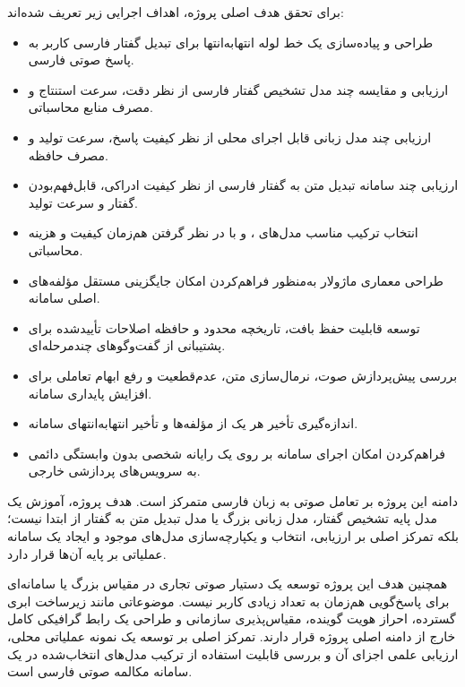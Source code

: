 برای تحقق هدف اصلی پروژه، اهداف اجرایی زیر تعریف شده‌اند:

\begin{itemize}

    \item طراحی و پیاده‌سازی یک خط لوله انتهابه‌انتها برای
    تبدیل گفتار فارسی کاربر به پاسخ صوتی فارسی.

    \item ارزیابی و مقایسه چند مدل تشخیص گفتار فارسی
    از نظر دقت، سرعت استنتاج و مصرف منابع محاسباتی.

    \item ارزیابی چند مدل زبانی قابل اجرای محلی
    از نظر کیفیت پاسخ، سرعت تولید و مصرف حافظه.

    \item ارزیابی چند سامانه تبدیل متن به گفتار فارسی
    از نظر کیفیت ادراکی، قابل‌فهم‌بودن گفتار و سرعت تولید.

    \item انتخاب ترکیب مناسب مدل‌های
    ،  و 
    با در نظر گرفتن هم‌زمان کیفیت و هزینه محاسباتی.

    \item طراحی معماری ماژولار به‌منظور فراهم‌کردن امکان
    جایگزینی مستقل مؤلفه‌های اصلی سامانه.

    \item توسعه قابلیت حفظ بافت، تاریخچه محدود و حافظه اصلاحات
    تأییدشده برای پشتیبانی از گفت‌وگوهای چندمرحله‌ای.

    \item بررسی پیش‌پردازش صوت، نرمال‌سازی متن، عدم‌قطعیت
     و رفع ابهام تعاملی برای افزایش پایداری سامانه.

    \item اندازه‌گیری تأخیر هر یک از مؤلفه‌ها و تأخیر
    انتهابه‌انتهای سامانه.

    \item فراهم‌کردن امکان اجرای سامانه بر روی یک رایانه شخصی
    بدون وابستگی دائمی به سرویس‌های پردازشی خارجی.

\end{itemize}

دامنه این پروژه بر تعامل صوتی به زبان فارسی متمرکز است.
هدف پروژه، آموزش یک مدل پایه تشخیص گفتار، مدل زبانی بزرگ
یا مدل تبدیل متن به گفتار از ابتدا نیست؛ بلکه تمرکز اصلی بر
ارزیابی، انتخاب و یکپارچه‌سازی مدل‌های موجود و ایجاد یک سامانه
عملیاتی بر پایه آن‌ها قرار دارد.

همچنین هدف این پروژه توسعه یک دستیار صوتی تجاری در مقیاس بزرگ
یا سامانه‌ای برای پاسخ‌گویی هم‌زمان به تعداد زیادی کاربر نیست.
موضوعاتی مانند زیرساخت ابری گسترده، احراز هویت گوینده،
مقیاس‌پذیری سازمانی و طراحی یک رابط گرافیکی کامل خارج از
دامنه اصلی پروژه قرار دارند.
تمرکز اصلی بر توسعه یک نمونه عملیاتی محلی، ارزیابی علمی اجزای
آن و بررسی قابلیت استفاده از ترکیب مدل‌های انتخاب‌شده در یک
سامانه مکالمه صوتی فارسی است.


